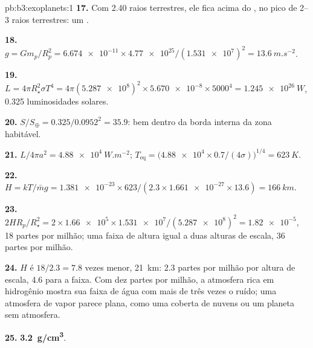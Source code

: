 \begin{solution}{pb:b3:exoplanets:1}
\textbf{17.} Com 2.40 raios terrestres, ele fica acima do , no
pico de 2--3 raios terrestres: um .

\textbf{18.} $g = Gm_p/R_p^2 = \num{6.674e-11}\times\num{4.77e25}/(\num{1.531e7})^2 =
\qty{13.6}{m.s^{-2}}$.

\textbf{19.} $L = 4\pi R_\star^2\sigma T^4 = 4\pi(\num{5.287e8})^2\times\num{5.670e-8}
\times5000^4 = \qty{1.245e26}{W}$, 0.325 luminosidades solares.

\textbf{20.} $S/S_\oplus = 0.325/0.0952^2 = 35.9$: bem dentro da borda interna da
zona habitável.

\textbf{21.} $L/4\pi a^2 = \qty{4.88e4}{W.m^{-2}}$; $T_\mathrm{eq} =
\bigl(\num{4.88e4}\times0.7/(4\sigma)\bigr)^{1/4} = \qty{623}{K}$.

\textbf{22.} $H = kT/\bar m g = \num{1.381e-23}\times623/(2.3\times\num{1.661e-27}
\times13.6) = \qty{166}{km}$.

\textbf{23.} $2HR_p/R_\star^2 = 2\times\num{1.66e5}\times\num{1.531e7}/
(\num{5.287e8})^2 = \num{1.82e-5}$, 18 partes por milhão; uma faixa de altura igual a
duas alturas de escala, 36 partes por milhão.

\textbf{24.} $H$ é $18/2.3 = 7.8$ vezes menor, \qty{21}{km}: 2.3 partes por
milhão por altura de escala, 4.6 para a faixa. Com dez partes por milhão, a
atmosfera rica em hidrogênio mostra sua faixa de água com mais de três vezes
o ruído; uma atmosfera de vapor parece plana, como uma coberta de nuvens ou um planeta
sem atmosfera.

\textbf{25.} \textbf{\qty[text-series-to-math=true]{3.2}{g/cm^3}}.
\end{solution}
